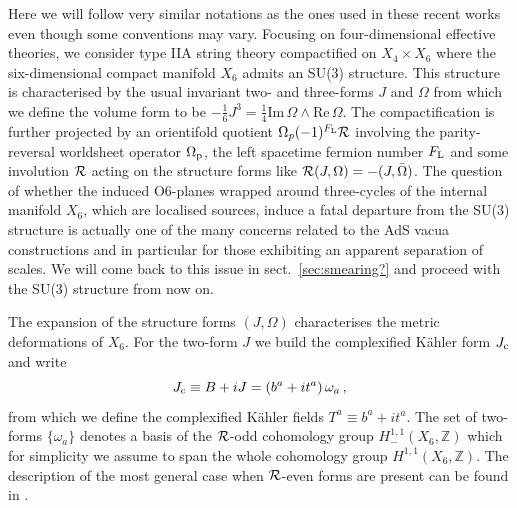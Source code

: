 \documentclass[11pt, a4paper]{article}
\newcommand{\Z}{\mathbb{Z}}
\newcommand{\cR}{{\cal R}}
\def\im{\mbox{Im}\, }
\def\re{\mbox{Re}\, }
\def\om{\omega}
\begin{document}
Here we will follow very similar notations as the ones used in these recent works \cite{Marchesano:2019hfb,Marchesano:2020uqz,Carrasco:2023hta} even though some conventions may vary. Focusing on four-dimensional effective theories, we consider type IIA string theory compactified on $X_4 \times X_6$ where the six-dimensional compact manifold $X_6$ admits an SU(3) structure. This structure is characterised by the usual invariant two- and three-forms $J$ and $\Omega$ from which we define the volume form to be $-\frac{1}{6}J^3 = \frac{1}{4} \im \Omega \wedge \re \Omega$. The compactification is further projected by an orientifold quotient $\Omega_p (-1)^{F_{\rm L}} {\cal R}$ \cite{Blumenhagen:2005mu,Blumenhagen:2006ci,Marchesano:2007de,Ibanez:2012zz,Marchesano:2022qbx} involving the parity-reversal worldsheet operator $\Omega_{\rm p}$, the left spacetime fermion number $F_{\rm L}$ and some involution ${\cal R}$ acting on the structure forms like ${\cal R}(J,\Omega) = -(J, \bar{\Omega})$. The question of whether the induced O6-planes wrapped around three-cycles of the internal manifold $X_6$, which are localised sources, induce a fatal departure from the SU(3) structure is actually one of the many concerns related to the AdS vacua constructions and in particular for those exhibiting an apparent separation of scales. We will come back to this issue in sect.~\ref{sec:smearing?} and proceed with the SU(3) structure from now on.

The expansion of the structure forms $(J,\Omega)$ characterises the metric deformations of $X_6$. For the two-form $J$ we build the complexified Kähler form $J_{\rm c}$ and write \cite{Gurrieri:2002wz,DAuria:2004kwe,Tomasiello:2005bp,Grana:2005ny,Kashani-Poor:2006ofe}
\begin{equation}
J_{\rm c} \equiv B+iJ = \left( b^a + i t^a\right) \om_a \, , 
\end{equation} 
%
from which we define the complexified K\"ahler fields $T^a \equiv b^a + i t^a$. The set of two-forms $\{\om_a\}$ denotes a basis of the $\cR$-odd cohomology group $H^{1,1}_-(X_6,\Z)$ which for simplicity we assume to span the whole cohomology group $H^{1,1}(X_6,\Z)$. The description of the most general case when $\cR$-even forms are present can be found in \cite{Marchesano:2020uqz}.
\end{document}
